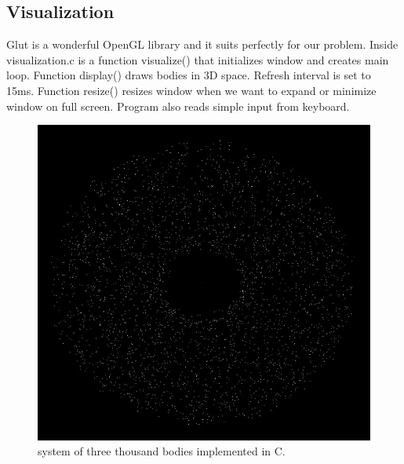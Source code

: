 \documentclass[A4]{article}
\begin{document}
\subsection{Visualization} 
Glut is a wonderful OpenGL library and it suits perfectly for our problem. Inside visualization.c is a function visualize() that initializes window and creates main loop. Function display() draws bodies in 3D space. Refresh interval is set to 15ms. Function resize() resizes window when we want to expand or minimize window on full screen. Program also reads simple input from keyboard. 
\newpage
\begin{figure}[t!]
\centering
\includegraphics[width=\textwidth]{visualization}
\caption{system of three thousand bodies implemented in C.}
\end{figure}
\end{document}
